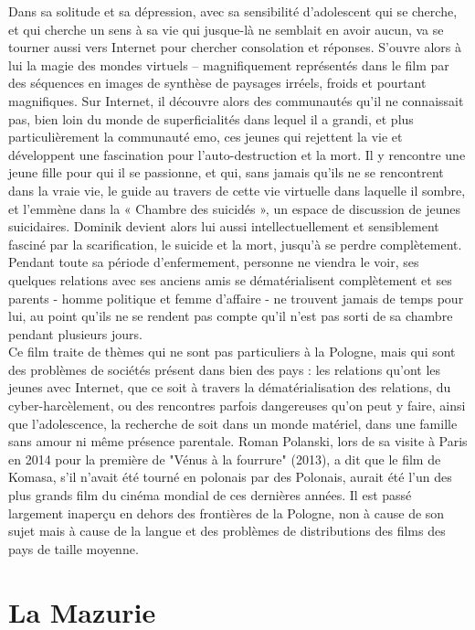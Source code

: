 \documentclass[12pt, twocolumn]{amsart}
\begin{document}
Dans sa solitude et sa dépression, avec sa sensibilité d’adolescent qui se cherche, et qui cherche un sens à sa vie qui jusque-là ne semblait en avoir aucun, va se tourner aussi vers Internet pour chercher consolation et réponses. S’ouvre alors à lui la magie des mondes virtuels – magnifiquement représentés dans le film par des séquences en images de synthèse de paysages irréels, froids et pourtant magnifiques. Sur Internet, il découvre alors des communautés qu’il ne connaissait pas, bien loin du monde de superficialités dans lequel il a grandi, et plus particulièrement la communauté emo, ces jeunes qui rejettent la vie et développent une fascination pour l’auto-destruction et la mort. Il y rencontre une jeune fille pour qui il se passionne, et qui, sans jamais qu’ils ne se rencontrent dans la vraie vie, le guide au travers de cette vie virtuelle dans laquelle il sombre, et l’emmène dans la « Chambre des suicidés », un espace de discussion de jeunes suicidaires. Dominik devient alors lui aussi intellectuellement et sensiblement fasciné par la scarification, le suicide et la mort, jusqu’à se perdre complètement. Pendant toute sa période d'enfermement, personne ne viendra le voir, ses quelques relations avec ses anciens amis se dématérialisent complètement et ses parents - homme politique et femme d'affaire - ne trouvent jamais de temps pour lui, au point qu'ils ne se rendent pas compte qu'il n'est pas sorti de sa chambre pendant plusieurs jours. \\
Ce film traite de thèmes qui ne sont pas particuliers à la Pologne, mais qui sont des problèmes de sociétés présent dans bien des pays : les relations qu'ont les jeunes avec Internet, que ce soit à travers la dématérialisation des relations, du cyber-harcèlement, ou des rencontres parfois dangereuses qu'on peut y faire, ainsi que l'adolescence, la recherche de soit dans un monde matériel, dans une famille sans amour ni même présence parentale. Roman Polanski, lors de sa visite à Paris en 2014 pour la première de "Vénus à la fourrure" (2013), a dit que le film de Komasa, s'il n'avait été tourné en polonais par des Polonais, aurait été l'un des plus grands film du cinéma mondial de ces dernières années. Il est passé largement inaperçu en dehors des frontières de la Pologne, non à cause de son sujet mais à cause de la langue et des problèmes de distributions des films des pays de taille moyenne. 
\clearpage
\section{La Mazurie}
\end{document}
